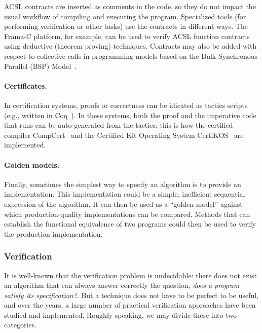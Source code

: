 ACSL contracts are inserted as comments in the code, so they do not impact the usual workflow of compiling and executing the program.  Specialized tools (for performing verification or other tasks) use the contracts in different ways.  The Frama-C platform, for example, can be used to verify ACSL function contracts using deductive (theorem proving) techniques.
%
Contracts may also be added with respect
to collective calls in programming models based on the Bulk
Synchronous Parallel (BSP) Model~\cite{DBLP:conf/vmcai/SiegelZ11}.

\paragraph{Certificates.}  In certification systems, proofs or correctness can be idicated as tactics scripts~\cite{bertot2013interactive} (e.g., written in Coq~\cite{coq}).  In these systems, both the proof and the imperative code that runs can be auto-generated from the tactics; this is how the certified compiler CompCert~\cite{leroy2004compcert} and the Certified Kit Operating System CertiKOS~\cite{certikos} are implemented.

\paragraph{Golden models.}  Finally, sometimes the simplest way to specify an algorithm is to provide an implementation.  This implementation could be a simple, inefficient sequential expression of the algorithm.  It can then be used as a ``golden model'' against which production-quality implementations can be compared.  Methods that can establish the functional equivalence of two programs could then be used to verify the production implementation.



\subsubsection{Verification}

It is well-known that the verification problem is undecidable: there does not exist an algorithm that can always answer correctly the question, \emph{does a program satisfy its specification?}.  But a technique does not have to be perfect to be useful, and over the years, a large number of practical verification approaches have been studied and implemented.  Roughly speaking, we may divide these into two categories.

